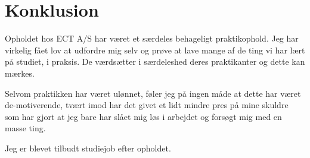 \chapter{Konklusion}

Opholdet hos ECT A/S har været et særdeles behageligt praktikophold. Jeg har virkelig fået lov at udfordre mig selv og prøve at lave mange af de ting vi har lært på studiet, i praksis. De værdsætter i særdeleshed deres praktikanter og dette kan mærkes.

Selvom praktikken har været ulønnet, føler jeg på ingen måde at dette har været de-motiverende, tvært imod har det givet et lidt mindre pres på mine skuldre som har gjort at jeg bare har slået mig løs i arbejdet og forsøgt mig med en masse ting. 

Jeg er blevet tilbudt studiejob efter opholdet.